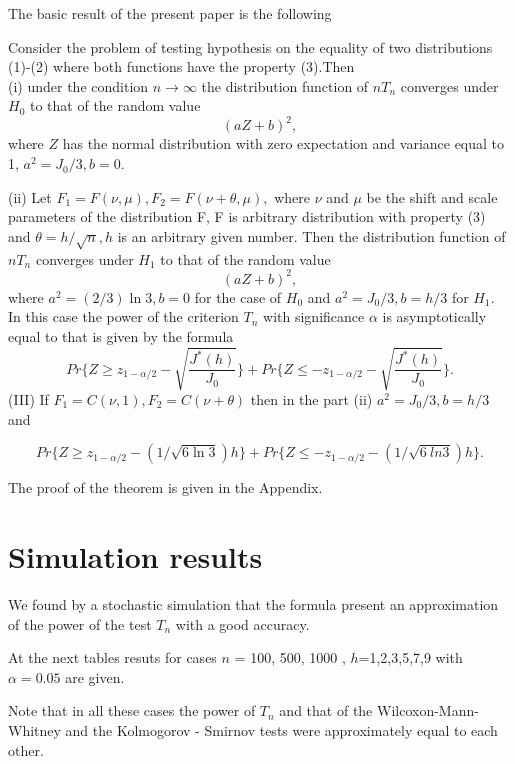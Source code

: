 \documentclass{svproc}
\begin{document}
The basic result of the present paper is the following
\begin{theorem} Consider the problem of testing hypothesis on the equality of two distributions (1)-(2) where both functions have the property (3).Then\\
(i) under the condition $n \to \infty$
the distribution function of $nT_n$  converges under $H_0$ to that of the random value
\begin{equation}\label{Distr}
(aZ + b)^2,
\end{equation}
where  $Z$ has the normal distribution with zero expectation and variance equal to 1, $a^2= J_0/3, b=0$.

(ii)
Let $F_1= F(\nu,\mu),F_2=F(\nu+\theta,\mu),$
where $\nu$  and $\mu$ be the shift and scale parameters of the distribution F, F is arbitrary distribution with property   (3) and
$\theta=h/\sqrt{n},h$ is an arbitrary given number. Then
the distribution function of $nT_n$  converges under $H_1$ to that of the random value
$$
(aZ + b)^2,
$$
where $a^2 =(2/3)\ln 3, b=0$
for the case of $H_0$ and
$a^2= J_0/3, b= h/3$
for  $H_1$.
In this case the power of the criterion $T_n$ with significance $\alpha$ is asymptotically equal to that is given by the formula
$$
Pr\{Z\geq z_{1-\alpha/2}-\sqrt{\frac {J^*(h)}{J_0}}\}
+ Pr\{Z\leq - z_{1-\alpha/2}-\sqrt{\frac {J^*(h)}{J_0}}\}.
$$
(III) If $F_1=C(\nu,1), F_2=C(\nu + \theta)$ then in the part (ii)
$a^2= J_0/3, b= h/3$ and

$$
Pr\{Z\geq z_{1-\alpha/2}-(1/\sqrt{6\ln 3})h\}
+ Pr\{Z\leq - z_{1-\alpha/2}-(1/\sqrt{6\
ln 3})h\}.
$$
\end{theorem}

The proof of the theorem is given in the Appendix.



\section{Simulation results}

We found by a stochastic simulation that the formula present an approximation of the power of the test $T_n$ with a good accuracy.

At the next tables resuts for cases $n$ = 100, 500, 1000 , $h$=1,2,3,5,7,9 with $\alpha=0.05$ are given.

Note that in all these cases the power of  $T_n$ and  that of the Wilcoxon-Mann-Whitney and the
Kolmogorov - Smirnov tests were approximately equal to each other.
\end{document}

